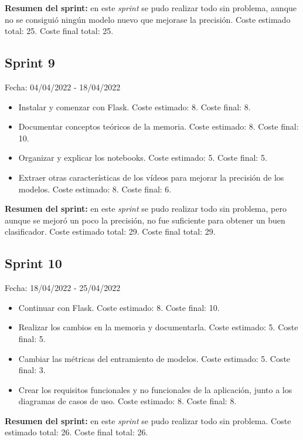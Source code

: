 \textbf{Resumen del sprint:} en este \textit{sprint} se pudo realizar todo sin problema, aunque no se consiguió ningún modelo nuevo que mejorase la precisión. Coste estimado total: 25. Coste final total: 25.

\subsection{Sprint 9}
Fecha: 04/04/2022 - 18/04/2022
\begin{itemize}
	\item Instalar y comenzar con Flask. Coste estimado: 8. Coste final: 8.
	\item Documentar conceptos teóricos de la memoria. Coste estimado: 8. Coste final: 10.
	\item Organizar y explicar los notebooks. Coste estimado: 5. Coste final: 5.
	\item Extraer otras características de los vídeos para mejorar la precisión de los modelos. Coste estimado: 8. Coste final: 6.
\end{itemize}

\textbf{Resumen del sprint:} en este \textit{sprint} se pudo realizar todo sin problema, pero aunque se mejoró un poco la precisión, no fue suficiente para obtener un buen clasificador. Coste estimado total: 29. Coste final total: 29.

\subsection{Sprint 10}
Fecha: 18/04/2022 - 25/04/2022
\begin{itemize}
	\item Continuar con Flask. Coste estimado: 8. Coste final: 10.
	\item Realizar los cambios en la memoria y documentarla. Coste estimado: 5. Coste final: 5.
	\item Cambiar las métricas del entramiento de modelos. Coste estimado: 5. Coste final: 3.
	\item Crear los requisitos funcionales y no funcionales de la aplicación, junto a los diagramas de casos de uso. Coste estimado: 8. Coste final: 8.
\end{itemize}

\textbf{Resumen del sprint:} en este \textit{sprint} se pudo realizar todo sin problema. Coste estimado total: 26. Coste final total: 26.

